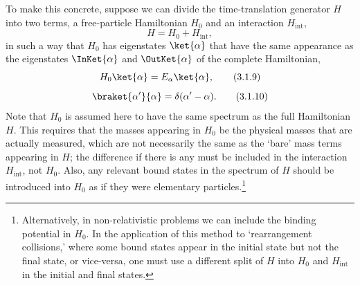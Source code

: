 To make this concrete, suppose we can divide the time-translation generator
$H$ into two terms, a free-particle Hamiltonian $H_0$ and an interaction
$H_{\mathrm{int}}$,
\begin{equation}
H=H_0+H_{\mathrm{int}},
\tag{3.1.8}\label{eq:3.1.8}
\end{equation}
in such a way that $H_0$ has eigenstates $\ket{\alpha}$ that have the same
appearance as the eigenstates $\InKet{\alpha}$ and
$\OutKet{\alpha}$ of the complete Hamiltonian,
\begin{equation}
H_0\ket{\alpha}=E_\alpha\ket{\alpha},
\tag{3.1.9}\label{eq:3.1.9}
\end{equation}
\begin{equation}
\braket{\alpha'}{\alpha}=\delta(\alpha'-\alpha).
\tag{3.1.10}\label{eq:3.1.10}
\end{equation}
Note that $H_0$ is assumed here to have the same spectrum as the full
Hamiltonian $H$. This requires that the masses appearing in $H_0$ be the
physical masses that are actually measured, which are not necessarily the
same as the `bare' mass terms appearing in $H$; the difference if there is any
must be included in the interaction $H_{\mathrm{int}}$, not $H_0$. Also, any
relevant bound states in the spectrum of $H$ should be introduced into $H_0$
as if they were elementary particles.\footnote{Alternatively, in
non-relativistic problems we can include the binding potential in $H_0$. In
the application of this method to `rearrangement collisions,' where some bound
states appear in the initial state but not the final state, or vice-versa, one
must use a different split of $H$ into $H_0$ and $H_{\mathrm{int}}$ in the
initial and final states.}

